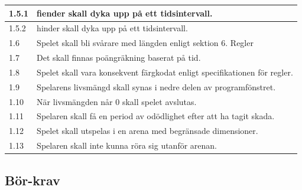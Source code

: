 \documentclass{TDP005mall}
\begin{document}
\begin{table}[!h]
\begin{tabularx}{\linewidth}{|l|X|}
1.5.1 &  fiender skall dyka upp på ett tidsintervall.\\\hline

1.5.2 &  hinder skall dyka upp på ett tidsintervall.\\\hline

1.6 &  Spelet skall bli svårare med längden enligt sektion 6. Regler\\\hline

1.7 &  Det skall finnas poängräkning baserat på tid.\\\hline

1.8 &  Spelet skall vara konsekvent färgkodat enligt specifikationen för regler.\\\hline

1.9 &  Spelarens livsmängd skall synas i nedre delen av programfönstret.\\\hline

1.10 &  När livsmängden når 0 skall spelet avslutas.\\\hline

1.11 &  Spelaren skall få en period av odödlighet efter att ha tagit skada.\\\hline

1.12 &  Spelet skall utspelas i en arena med begränsade dimensioner.\\\hline

1.13 &  Spelaren skall inte kunna röra sig utanför arenan.\\\hline

\end{tabularx}
\end{table}

\clearpage
\subsection{Bör-krav}
\end{document}
